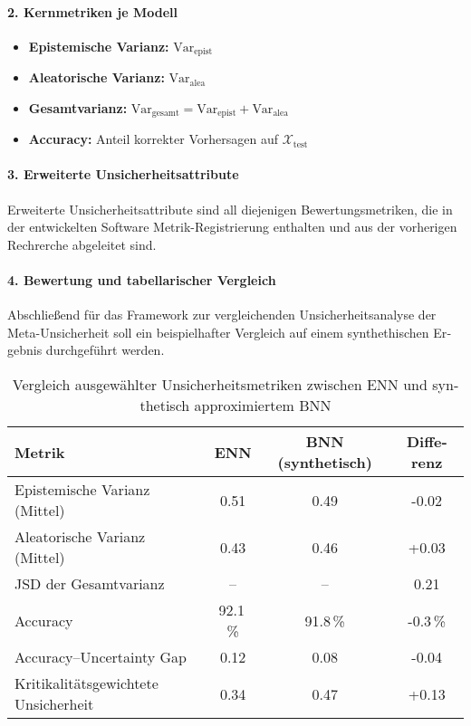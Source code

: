 \begin{otherlanguage}{ngerman}
{\paragraph{2. Kernmetriken je Modell}

\begin{itemize}
    \item \textbf{Epistemische Varianz:} \( \text{Var}_{\text{epist}} \)
    \item \textbf{Aleatorische Varianz:} \( \text{Var}_{\text{alea}} \)
    \item \textbf{Gesamtvarianz:} \( \text{Var}_{\text{gesamt}} = \text{Var}_{\text{epist}} + \text{Var}_{\text{alea}} \)
    \item \textbf{Accuracy:} Anteil korrekter Vorhersagen auf \( \mathcal{X}_{\text{test}} \)
\end{itemize}

\paragraph{3. Erweiterte Unsicherheitsattribute} Erweiterte Unsicherheitsattribute sind all diejenigen Bewertungsmetriken, die in der entwickelten Software Metrik-Registrierung enthalten und aus der vorherigen Rechrerche abgeleitet sind.

\paragraph{4. Bewertung und tabellarischer Vergleich} Abschließend für das Framework zur vergleichenden Unsicherheitsanalyse der Meta-Unsicherheit soll ein beispielhafter Vergleich auf einem synthethischen Ergebnis durchgeführt werden.


\begin{table}[h]
\centering
\begin{tabular}{|l|c|c|c|}
\hline
\textbf{Metrik} & \textbf{ENN} & \textbf{BNN (synthetisch)} & \textbf{Differenz} \\
\hline
Epistemische Varianz (Mittel) & 0.51 & 0.49 & -0.02 \\
Aleatorische Varianz (Mittel) & 0.43 & 0.46 & +0.03 \\
JSD der Gesamtvarianz         & --   & --   & 0.21 \\
Accuracy                      & 92.1\,\% & 91.8\,\% & -0.3\,\% \\
Accuracy–Uncertainty Gap      & 0.12 & 0.08 & -0.04 \\
Kritikalitätsgewichtete Unsicherheit & 0.34 & 0.47 & +0.13 \\
\hline
\end{tabular}
\caption{Vergleich ausgewählter Unsicherheitsmetriken zwischen ENN und synthetisch approximiertem BNN}
\end{table}

}
\end{otherlanguage}
